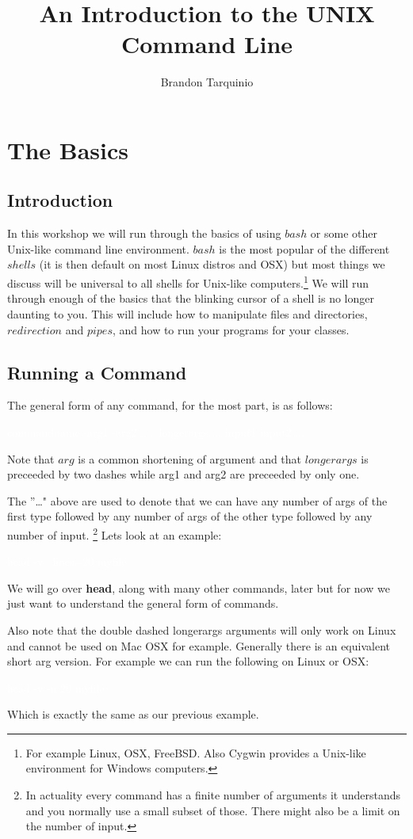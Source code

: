\documentclass{book}
\newcommand{\commandline}[1]{\begin{center} \colorbox{Dark}{\textcolor{white}{#1}} \end{center}}
\begin{document}
\title{An Introduction to the UNIX Command Line}
\author{Brandon Tarquinio}

\maketitle
\tableofcontents
\newpage
\chapter{The Basics}

\section{Introduction}
In this workshop we will run through the basics of using $bash$ or some other Unix-like command line environment. $bash$ is the most popular of the different $shells$ (it is then default on most Linux distros and OSX) but most things we discuss will be universal to all shells for Unix-like computers.\footnote{For example Linux, OSX, FreeBSD. Also Cygwin provides a Unix-like environment for Windows computers.} We will run through enough of the basics that the blinking cursor of a shell is no longer daunting to you. This will include how to manipulate files and directories, $redirection$ and $pipes$, and how to run your programs for your classes. 


\section{Running a Command}
The general form of any command, for the most part, is as follows:
\commandline{commandname -arg1 -arg2 ... --longerargs ... input1 input2 ...}
Note that $arg$ is a common shortening of argument and that $longerargs$ is preceeded by two dashes while arg1 and arg2 are preceeded by only one.


The ''\dots" above are used to denote that we can have any number of args of the first type followed by any number of args of the other type followed by any number of input. \footnote{In actuality every command has a finite number of arguments it understands and you normally use a small subset of those. There might also be a limit on the number of input.}
Lets look at an example:
\commandline{head -v --lines=20 myfile}
We will go over \textbf{head}, along with many other commands, later but for now we just want to understand the general form of commands. 

Also note that the double dashed longerargs arguments will only work on Linux and cannot be used on Mac OSX for example. Generally there is an equivalent short arg version. For example we can run the following on Linux or OSX:
\commandline{head -v -n 20 myfile}
Which is exactly the same as our previous example. 
\end{document}
